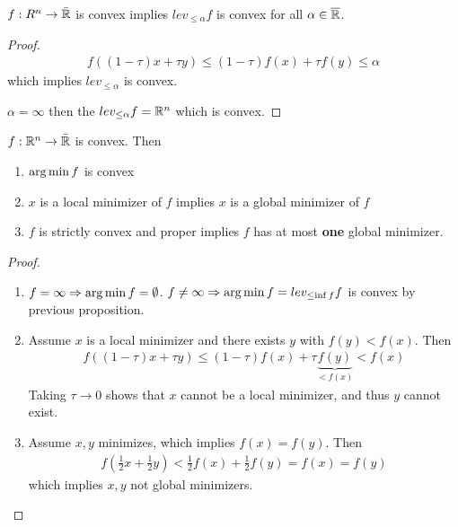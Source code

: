 \begin{proposition}
  $f: R^{n} \rightarrow \bar {\mathbb{R}}$ is convex implies $lev_{\leq \alpha}
  f$ is convex for all $\alpha \in \overline {\mathbb{R}}$.
\end{proposition}

\begin{proof}
  \begin{align*}
    f((1-\tau) x + \tau y) \leq (1-\tau)f(x) + \tau f(y) \leq \alpha
  \end{align*} which implies $lev_{\leq \alpha}$ is convex.
  
  $\alpha = \infty$ then the $lev_{\leq \alpha} f = \mathbb{R}^{n}$ which is convex.
\end{proof}

\begin{thm}
  \label{defn:convexity:4}
  $f: \mathbb{R}^{n} \rightarrow \bar {\mathbb{R}}$ is convex.  Then
  \begin{enumerate}
  \item $\operatorname*{arg\,min} f$ is convex
  \item $x$ is a local minimizer of $f$ implies $x$ is a global
    minimizer of $f$
  \item $f$ is strictly convex and proper implies $f$ has at most
    \textbf{one} global minimizer.
  \end{enumerate}
\end{thm}

\begin{proof}
  \begin{enumerate}
  \item $f = \infty \Rightarrow \operatorname*{arg\,min} f = \emptyset$. $f \neq \infty
    \Rightarrow \operatorname*{arg\,min} f = lev_{\leq \inf f} f$ is convex by previous proposition.
  \item Assume $x$ is a local minimizer and there exists $y$ with
    $f(y) < f(x)$.  Then
    \begin{align*}
      f((1-\tau)x + \tau y) \leq (1-\tau) f(x) + \tau
      \underbrace{f(y)}_{< f(x)} < f(x)
    \end{align*} Taking $\tau \rightarrow 0$ shows that $x$ cannot be
    a local minimizer, and thus $y$ cannot exist.
  \item Assume $x, y$ minimizes, which implies $f(x) = f(y)$.  Then
    \begin{align*}
      f(\frac{1}{2} x + \frac{1}{2} y) < \frac{1}{2} f(x) +
      \frac{1}{2} f(y) = f(x) = f(y)
    \end{align*} which implies $x, y$ not global minimizers.
  \end{enumerate}
\end{proof}

